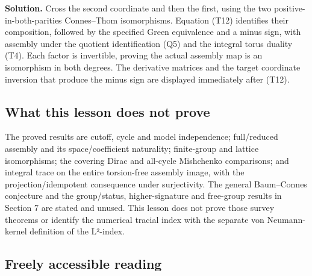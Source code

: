 \documentclass[
  11pt,
]{article}
\begin{document}
\textbf{Solution.} Cross the second coordinate and then the first, using
the two positive-in-both-parities Connes--Thom isomorphisms. Equation
(T12) identifies their composition, followed by the specified Green
equivalence and a minus sign, with assembly under the quotient
identification (Q5) and the integral torus duality (T4). Each factor is
invertible, proving the actual assembly map is an isomorphism in both
degrees. The derivative matrices and the target coordinate inversion
that produce the minus sign are displayed immediately after (T12).

\subsection{What this lesson does not
prove}\label{what-this-lesson-does-not-prove}

The proved results are cutoff, cycle and model independence;
full/reduced assembly and its space/coefficient naturality; finite-group
and lattice isomorphisms; the covering Dirac and all-cycle Mishchenko
comparisons; and integral trace on the entire torsion-free assembly
image, with the projection/idempotent consequence under surjectivity.
The general Baum--Connes conjecture and the group/status,
higher-signature and free-group results in Section 7 are stated and
unused. This lesson does not prove those survey theorems or identify the
numerical tracial index with the separate von Neumann-kernel definition
of the L²-index.

\subsection{Freely accessible reading}\label{freely-accessible-reading}
\end{document}
